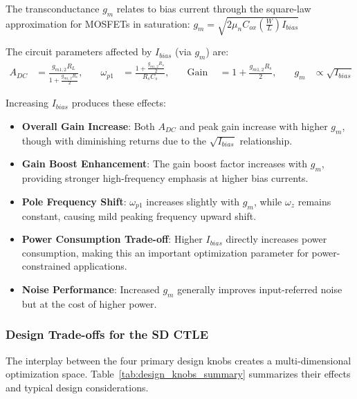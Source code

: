 The transconductance $g_m$ relates to bias current through the square-law approximation for MOSFETs in saturation: $g_m = \sqrt{2\mu_n C_{ox} \left(\frac{W}{L}\right) I_{bias}}$

The circuit parameters affected by $I_{bias}$ (via $g_m$) are:
\[
\begin{aligned}
A_{DC} &= \frac{g_{m1,2}R_L}{1 + \frac{g_{m1,2}R_s}{2}}, &\quad
\omega_{p1} &= \frac{1 + \frac{g_{m1,2} R_s}{2}}{R_s C_s}, &\quad
\text{Gain Boost} &= 1 + \frac{g_{m1,2} R_s}{2}, &\quad
g_m &\propto \sqrt{I_{bias}}
\end{aligned}
\]

Increasing $I_{bias}$ produces these effects:

\begin{itemize}
    \item \textbf{Overall Gain Increase}: Both $A_{DC}$ and peak gain increase with higher $g_m$, though with diminishing returns due to the $\sqrt{I_{bias}}$ relationship.
    \item \textbf{Gain Boost Enhancement}: The gain boost factor increases with $g_m$, providing stronger high-frequency emphasis at higher bias currents.
    \item \textbf{Pole Frequency Shift}: $\omega_{p1}$ increases slightly with $g_m$, while $\omega_z$ remains constant, causing mild peaking frequency upward shift.
    \item \textbf{Power Consumption Trade-off}: Higher $I_{bias}$ directly increases power consumption, making this an important optimization parameter for power-constrained applications.
    \item \textbf{Noise Performance}: Increased $g_m$ generally improves input-referred noise but at the cost of higher power.
\end{itemize}


\subsubsection{Design Trade-offs for the SD CTLE}
\label{subsec:design_tradeoffs}

The interplay between the four primary design knobs creates a multi-dimensional optimization space. Table~\ref{tab:design_knobs_summary} summarizes their effects and typical design considerations.

